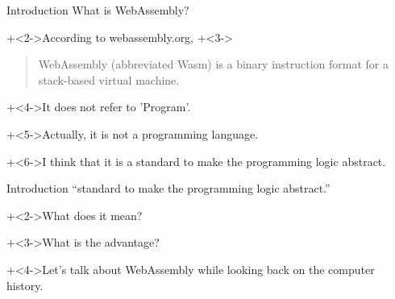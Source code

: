 %
%

\begin{frame}{Introduction}{}
    What is WebAssembly?
    \vspace{2ex}

    \onslide+<2->{According to webassembly.org,}
    \onslide+<3->{\begin{quote}WebAssembly (abbreviated Wasm) is a binary instruction format for a stack-based virtual machine.\end{quote}}

    \onslide+<4->{It does not refer to 'Program'.}

    \onslide+<5->{Actually, it is not a programming language.}
    \vspace{2ex}

    \onslide+<6->{I think that it is a standard to make the programming logic abstract.}
\end{frame}


\begin{frame}{Introduction}{}
    ``standard to make the programming logic abstract.''
    \vspace{4ex}

    \onslide+<2->{What does it mean?}

    \onslide+<3->{What is the advantage?}
    \vspace{4ex}

    \onslide+<4->{Let's talk about WebAssembly
    while looking back on the computer history.}
\end{frame}
